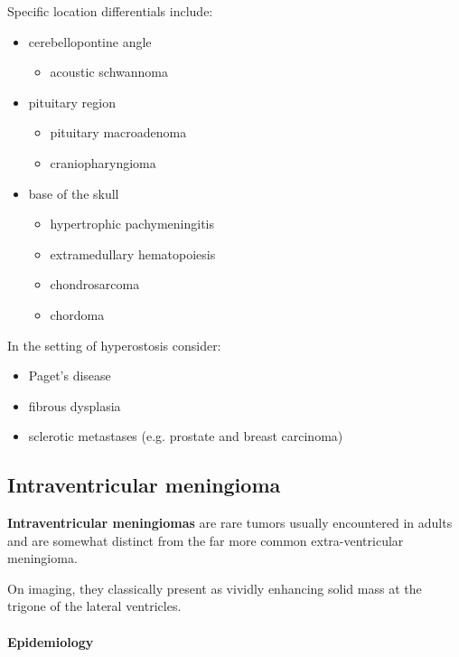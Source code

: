 Specific location differentials include:

\begin{itemize}
	\item
	cerebellopontine angle
	
	\begin{itemize}
		\item
		acoustic schwannoma
	\end{itemize}
	\item
	pituitary region
	
	\begin{itemize}
		\item
		pituitary macroadenoma
		\item
		craniopharyngioma
	\end{itemize}
	\item
	base of the skull
	
	\begin{itemize}
		\item
		hypertrophic pachymeningitis
		\item
		extramedullary hematopoiesis
		\item
		chondrosarcoma
		\item
		chordoma
	\end{itemize}
\end{itemize}

In the setting of hyperostosis consider:

\begin{itemize}
	\item
	Paget's disease
	\item
	fibrous dysplasia
	\item
	sclerotic metastases (e.g. prostate and breast carcinoma)
\end{itemize}
\subsection{Intraventricular meningioma}

\textbf{Intraventricular meningiomas} are rare tumors usually encountered in adults and are somewhat distinct from the far more common extra-ventricular meningioma.

On imaging, they classically present as vividly enhancing solid mass at the trigone of the lateral ventricles.

\paragraph{Epidemiology}

